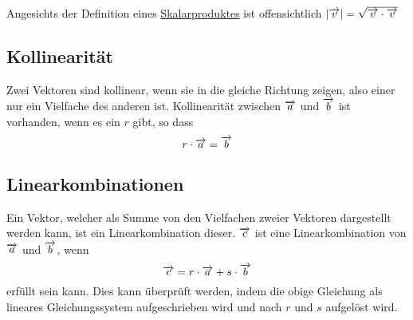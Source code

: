 \documentclass{article}
\begin{document}
\vspace{\baselineskip} \noindent
Angesichts der Definition eines \hyperref[Skalarprodukte]{Skalarproduktes} ist offensichtlich $\left| {\overrightarrow{v}} \right| = \sqrt{\overrightarrow{v} \cdot \overrightarrow{v}}$ 
 
\subsection{Kollinearität} 
Zwei Vektoren sind kollinear, wenn sie in die gleiche Richtung zeigen, also einer nur ein Vielfache des anderen ist. Kollinearität zwischen $\overrightarrow{a}$ und $\overrightarrow{b}$ ist vorhanden, wenn es ein $r$ gibt, so dass 
\[ 
 r \cdot \overrightarrow{a} = \overrightarrow{b}
\]
 
\subsection{Linearkombinationen} 
Ein Vektor, welcher als Summe von den Vielfachen zweier Vektoren dargestellt werden kann, ist ein Linearkombination dieser. $\overrightarrow{c}$ ist eine Linearkombination von $\overrightarrow{a}$ und $\overrightarrow{b}$, wenn
\[
 \overrightarrow{c} = r \cdot \overrightarrow{a} + s \cdot \overrightarrow{b} 
\]
erfüllt sein kann. Dies kann überprüft werden, indem die obige Gleichung als lineares Gleichungssystem aufgeschrieben wird  und nach $r$ und $s$ aufgelöst wird.
 
\end{document}
